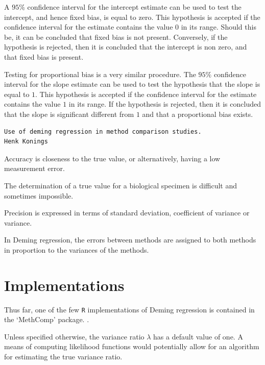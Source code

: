 \documentclass[12pt, a4paper]{report}
\theoremstyle{plain}
\theoremstyle{definition}
\theoremstyle{remark}
\begin{document}
A $95\%$ confidence interval for the intercept estimate can be used to test the intercept, and hence fixed bias, is equal to
zero. This hypothesis is accepted if the confidence interval for the estimate contains the value $0$ in its range. Should this be,
it can be concluded that fixed bias is not present. Conversely, if the hypothesis is rejected, then it is concluded that the
intercept is non zero, and that fixed bias is present.

Testing for proportional bias is a very similar procedure. The
$95\%$ confidence interval for the slope estimate can be used to
test the hypothesis that the slope is equal to $1$. This
hypothesis is accepted if the confidence interval for the estimate
contains the value $1$ in its range. If the hypothesis is
rejected, then it is concluded that the slope is significant
different from $1$ and that a proportional bias exists.




\begin{verbatim}
Use of deming regression in method comparison studies.
Henk Konings
\end{verbatim}

Accuracy is closeness to the true value, or alternatively, having a low measurement error.

The determination of a true value for a biological specimen is difficult and sometimes impossible.

Precision is expressed in terms of standard deviation, coefficient of variance or variance.

In Deming regression, the errors between methods are assigned to both methods in proportion to the variances of the methods.





\section{Implementations}
Thus far, one of the few \texttt{R} implementations of Deming regression is contained in the `MethComp' package. \citep{BXC2008}.

Unless specified otherwise, the variance ratio $\lambda$ has a default value of one. A means of computing likelihood functions would potentially allow for an algorithm for estimating the true variance ratio.
\end{document}
